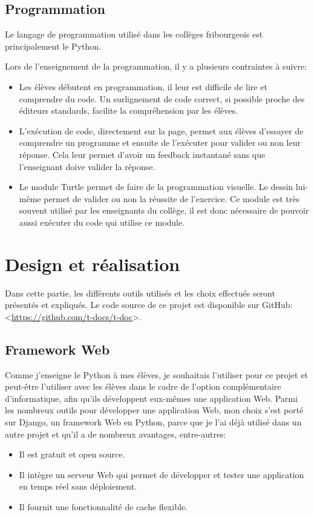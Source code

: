 \documentclass[12pt,titlepage,oneside]{article}
\renewcommand{\footnote}[1]{}
\begin{document}
\newpage

\subsection{Programmation}
Le langage de programmation utilisé dans les collèges fribourgeois est principalement le Python.\par
Lors de l'enseignement de la programmation, il y a plusieurs contraintes à suivre:
\begin{itemize}
\item Les élèves débutent en programmation, il leur est difficile de lire et comprendre du code. Un surlignement de code correct, si possible proche des éditeurs standards, facilite la compréhension par les élèves.
\item L'exécution de code, directement sur la page, permet aux élèves d'essayer de comprendre un programme et ensuite de l'exécuter pour valider ou non leur réponse. Cela leur permet d'avoir un feedback instantané sans que l'enseignant doive valider la réponse.
\item Le module Turtle permet de faire de la programmation visuelle. Le dessin lui-même permet de valider ou non la réussite de l'exercice. Ce module est très souvent utilisé par les enseignants du collège, il est donc nécessaire de pouvoir aussi exécuter du code qui utilise ce module.
\end{itemize}

\section{Design et réalisation}
Dans cette partie, les différents outils utilisés et les choix effectués seront présentés et expliqués. Le code source de ce projet est disponible sur GitHub: <\url{https://github.com/t-docs/t-doc}>.

\subsection{Framework Web}
Comme j'enseigne le Python à mes élèves, je souhaitais l'utiliser pour ce projet et peut-être l'utiliser avec les élèves dans le cadre de l'option complémentaire d'informatique, afin qu'ils développent eux-mêmes une application Web. Parmi les nombreux outils pour développer une application Web, mon choix s'est porté sur Django\footnote{\url{https://www.djangoproject.com/}}, un framework Web en Python, parce que je l'ai déjà utilisé dans un autre projet et qu'il a de nombreux avantages, entre-autres:
\begin{itemize}
\item Il est gratuit et open source.
\item Il intègre un serveur Web qui permet de développer et tester une application en temps réel sans déploiement.
\item Il fournit une fonctionnalité de cache flexible.
\end{itemize}
\end{document}
